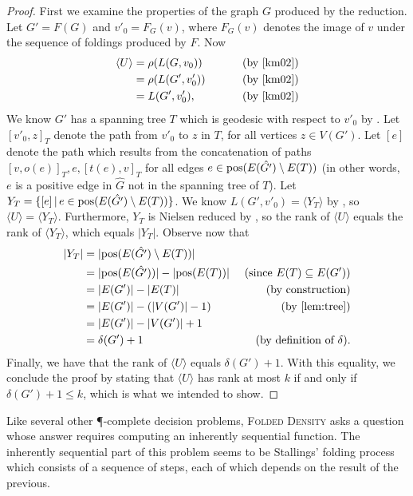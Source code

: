 \documentclass{article}
\newcommand{\FD}{\textsc{Folded Density}}
\newcommand{\gen}[1]{\langle #1 \rangle}
\newcommand{\pos}{\textnormal{pos}}
\begin{document}
\begin{proof}
  First we examine the properties of the graph $G$ produced by the reduction.
  Let $G' = F(G)$ and $v'_0 = F_G(v)$, where $F_G(v)$ denotes the image of $v$ under the sequence of foldings produced by $F$.
  Now
  \begin{align*}
    \gen{U} & = \rho(L(G, v_0)) & \qquad \text{ (by \cite[Proposition~3.8]{km02})} \\
            & = \rho(L(G', v'_0)) & \qquad \text{ (by \cite[Lemma~3.4]{km02})} \\
            & = L(G', v'_0), & \qquad \text{ (by \cite[Lemma~2.9]{km02})}
  \end{align*}
  We know $G'$ has a spanning tree $T$ which is geodesic with respect to $v'_0$ by \cite[Lemma~6.6]{km02}.
  Let $[v'_0, z]_T$ denote the path from $v'_0$ to $z$ in $T$, for all vertices $z \in V(G')$.
  Let $[e]$ denote the path which results from the concatenation of paths $[v, o(e)]_T, e, [t(e), v]_T$ for all edges $e \in \pos(E(\hat{G'}) \setminus E(T))$ (in other words, $e$ is a positive edge in $\hat{G}$ not in the spanning tree of $T$).
  Let $Y_T = \{[e] \, | \, e \in \pos(E(\hat{G'}) \setminus E(T)) \}$.
  We know $L(G', v'_0) = \gen{Y_T}$ by \cite[Lemma~6.1]{km02}, so $\gen{U} = \gen{Y_T}$.
  Furthermore, $Y_T$ is Nielsen reduced by \cite[Proposition~6.7]{km02}, so the rank of $\gen{U}$ equals the rank of $\gen{Y_T}$, which equals $|Y_T|$.
  Observe now that
  \begin{align*}
    |Y_T| & = |\pos(E(\hat{G'}) \setminus E(T))| & \\
          & = |\pos(E(\hat{G'}))| - |\pos(E(T))| & \text{ (since } E(T) \subseteq E(G') \text{)} \\
          & = |E(G')| - |E(T)| & \text{ (by construction)} \\
          & = |E(G')| - (|V(G')| - 1) & \text{ (by \autoref{lem:tree})} \\
          & = |E(G')| - |V(G')| + 1 & \\
          & = \delta(G') + 1 & \text{ (by definition of } \delta \text{)}.
  \end{align*}
  Finally, we have that the rank of $\gen{U}$ equals $\delta(G') + 1$.
  With this equality, we conclude the proof by stating that $\gen{U}$ has rank at most $k$ if and only if $\delta(G') + 1 \leq k$, which is what we intended to show.
\end{proof}

Like several other \P-complete decision problems, \FD{} asks a question whose answer requires computing an inherently sequential function.
The inherently sequential part of this problem seems to be Stallings' folding process which consists of a sequence of steps, each of which depends on the result of the previous.
\end{document}
